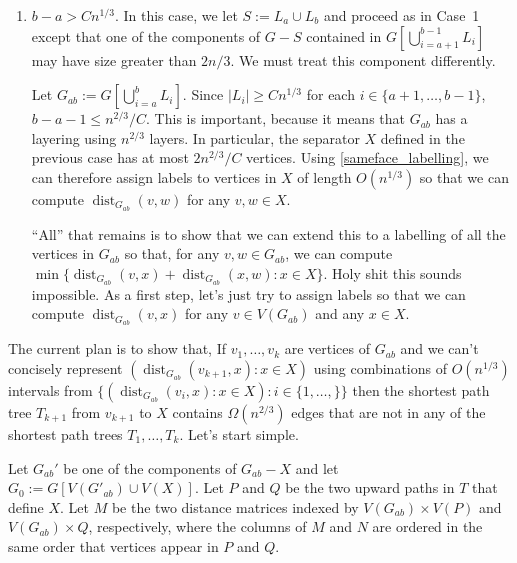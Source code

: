 \documentclass{patmorin}
\DeclareMathOperator{\dist}{dist}
\begin{document}
\begin{enumerate}
    \item $b-a > Cn^{1/3}$.  In this case, we let $S:=L_a\cup L_b$ and proceed as in Case~1 except that one of the components of $G-S$ contained in $G[\bigcup_{i=a+1}^{b-1}L_i]$ may have size greater than $2n/3$.  We must treat this component differently.

    Let $G_{ab}:=G[\bigcup_{i=a}^b L_i]$.  Since $|L_i|\ge Cn^{1/3}$ for each $i\in\{a+1,\ldots,b-1\}$, $b-a-1\le n^{2/3}/C$.  This is important, because it means that $G_{ab}$ has a layering using $n^{2/3}$ layers.  In particular, the separator $X$ defined in the previous case has at most  $2n^{2/3}/C$ vertices.  Using \cref{sameface_labelling}, we can therefore assign labels to vertices in $X$ of length $O(n^{1/3})$ so that we can compute $\dist_{G_{ab}}(v,w)$ for any $v,w\in X$.

    ``All'' that remains is to show that we can extend this to a labelling of all the vertices in $G_{ab}$ so that, for any $v,w\in G_{ab}$, we can compute $\min\{\dist_{G_{ab}}(v,x)+\dist_{G_{ab}}(x,w): x\in X\}$.  Holy shit this sounds impossible.  As a first step, let's just try to assign labels so that we can compute $\dist_{G_{ab}}(v,x)$ for any $v\in V(G_{ab})$ and any $x\in X$.
\end{enumerate}

The current plan is to show that, If $v_1,\ldots,v_k$ are vertices of $G_{ab}$ and we can't concisely represent $(\dist_{G_{ab}}(v_{k+1},x):x\in X)$ using combinations of $O(n^{1/3})$ intervals from $\{(\dist_{G_{ab}}(v_{i},x):x\in X):i\in\{1,\ldots,\}\}$ then the shortest path tree $T_{k+1}$ from $v_{k+1}$ to $X$ contains $\Omega(n^{2/3})$ edges that are not in any of the shortest path trees $T_1,\ldots,T_k$.  Let's start simple.

Let $G_{ab}'$ be one of the components of $G_{ab}-X$ and let $G_0:=G[V(G'_{ab})\cup V(X)]$.  Let $P$ and $Q$ be the two upward paths in $T$ that define $X$.  Let $M$ be the two distance matrices indexed by $V(G_{ab})\times V(P)$ and $V(G_{ab})\times Q$, respectively, where the columns of $M$ and $N$ are ordered in the same order that vertices appear in $P$ and $Q$.
\end{document}

